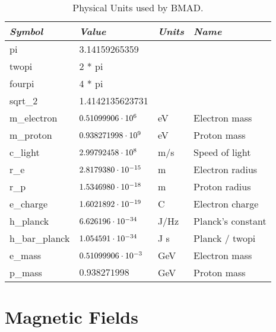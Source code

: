 \begin{table}
\begin{tabular}{|l|l|l|l|} \hline
  {\em Symbol}   & {\em Value}       & {\em Units} &  {\em Name}     \\ \hline
  pi             & 3.14159265359          &        &                   \\
  twopi          & 2 * pi                 &        &                   \\
  fourpi         & 4 * pi                 &        &                   \\
  sqrt\_2        & 1.4142135623731        &        &                   \\
  m\_electron    & $0.51099906 \cdot 10^{6}$   & eV     & Electron mass     \\
  m\_proton      & $0.938271998 \cdot 10^{9}$  & eV     & Proton mass       \\
  c\_light       & $2.99792458 \cdot 10^{8}$   & m/s    & Speed of light    \\
  r\_e           & $2.8179380 \cdot 10^{-15}$  & m      & Electron radius   \\
  r\_p           & $1.5346980 \cdot 10^{-18}$  & m      & Proton radius     \\
  e\_charge      & $1.6021892 \cdot 10^{-19}$  & C      & Electron charge   \\
  h\_planck      & $6.626196 \cdot 10^{-34}$   & J/Hz   & Planck's constant \\
  h\_bar\_planck & $1.054591 \cdot 10^{-34}$   & J s    & Planck / twopi    \\
  e\_mass        & $0.51099906 \cdot 10^{-3}$  & GeV    & Electron mass     \\
  p\_mass        & $0.938271998$          & GeV    & Proton mass     \\ \hline
\end{tabular}
\caption{Physical Units used by BMAD.}
\label{t:constants}
\end{table}


\section{Magnetic Fields}

